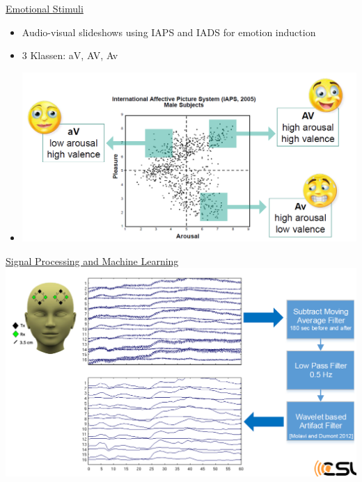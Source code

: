 \documentclass[a4paper,10pt,oneside]{article}
\begin{document}
\underline{Emotional Stimuli} \\ 		
	\begin{itemize}
		\item Audio-visual slideshows using IAPS and IADS for emotion induction
		\item 3 Klassen: aV, AV, Av
		\item[] \includegraphics[scale=0.25]{Grafiken/2127.png}
	\end{itemize}
	

\underline{Signal Processing and Machine Learning} \\
	\includegraphics[scale=0.25]{Grafiken/2131.png}
	
\end{document}
